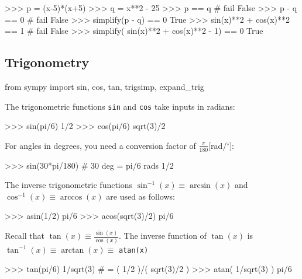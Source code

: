 \small
\begin{verbatimtab}
>>> p = (x-5)*(x+5)
>>> q = x**2 - 25
>>> p == q                                      # fail
False
>>> p - q == 0                                  # fail 
False
>>> simplify(p - q) == 0          
True
>>> sin(x)**2 + cos(x)**2  == 1                 # fail
False
>>> simplify( sin(x)**2 + cos(x)**2  - 1) == 0
True
\end{verbatimtab}
\normalsize


\subsection{Trigonometry}
\label{basics:trigonometry}

\small
\begin{verbatimtab}
from sympy import sin, cos, tan, trigsimp, expand_trig
\end{verbatimtab}
\normalsize

\noindent
The trigonometric functions \texttt{sin} and \texttt{cos} take inputs in radians: 



\small
\begin{verbatimtab}
>>> sin(pi/6)
1/2
>>> cos(pi/6)
sqrt(3)/2
\end{verbatimtab}
\normalsize

\noindent
For angles in degrees, 
you need a conversion factor of $\frac{\pi}{180}$[rad/$^\circ$]:

\small
\begin{verbatimtab}
>>> sin(30*pi/180)                 # 30 deg = pi/6 rads 
1/2
\end{verbatimtab}
\normalsize

\noindent
The inverse trigonometric functions $\sin^{-1}(x)\equiv \arcsin(x)$
and $\cos^{-1}(x)\equiv \arccos(x)$ are used as follows:

\small
\begin{verbatimtab}
>>> asin(1/2)
pi/6
>>> acos(sqrt(3)/2)
pi/6
\end{verbatimtab}
\normalsize
Recall that $\tan(x) \equiv \frac{\sin(x)}{\cos(x)}$.
The inverse function of $\tan(x)$ is $\tan^{-1}(x)\equiv \arctan(x)\equiv$ \texttt{atan(x)}



\small
\begin{verbatimtab}
>>> tan(pi/6)
1/sqrt(3)                          # = ( 1/2 )/( sqrt(3)/2 )
>>> atan( 1/sqrt(3) )
pi/6
\end{verbatimtab}
\normalsize

